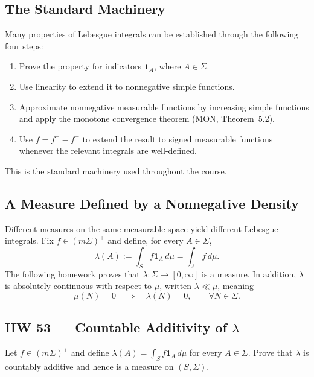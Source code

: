 \subsection*{The Standard Machinery}%
%

Many properties of Lebesgue integrals can be established through the following four steps:
\begin{enumerate}
\item Prove the property for indicators $\mathbf1_A$, where $A\in\Sigma$.
\item Use linearity to extend it to nonnegative simple functions.
\item Approximate nonnegative measurable functions by increasing simple functions and apply the monotone convergence theorem (MON, Theorem~5.2).
\item Use $f=f^+-f^-$ to extend the result to signed measurable functions whenever the relevant integrals are well-defined.
\end{enumerate}
This is the standard machinery used throughout the course.

\subsection*{A Measure Defined by a Nonnegative Density}%
%

Different measures on the same measurable space yield different Lebesgue integrals. Fix $f\in(m\Sigma)^+$ and define, for every $A\in\Sigma$,
\[
\lambda(A):=\int_S f\mathbf1_A\,d\mu=\int_A f\,d\mu.
\]
The following homework proves that $\lambda:\Sigma\to[0,\infty]$ is a measure. In addition, $\lambda$ is absolutely continuous with respect to $\mu$, written $\lambda\ll\mu$, meaning
\[
\mu(N)=0\quad\Longrightarrow\quad\lambda(N)=0,
\qquad\forall N\in\Sigma.
\]

\subsection*{HW 53 --- Countable Additivity of $\lambda$}%
%

 Let $f\in(m\Sigma)^+$ and define $\lambda(A)=\int_S f\mathbf1_A\,d\mu$ for every $A\in\Sigma$. Prove that $\lambda$ is countably additive and hence is a measure on $(S,\Sigma)$.

